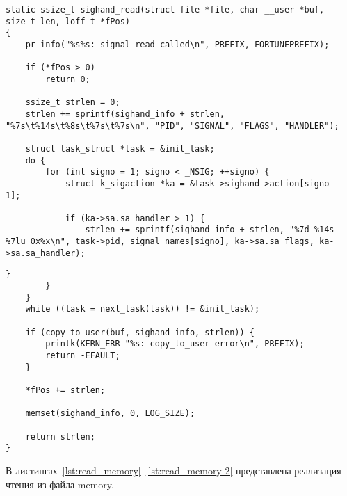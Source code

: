 \begin{lstlisting}[label=lst:read_sighands, caption=Реализация функции чтения из файла sighands]			
static ssize_t sighand_read(struct file *file, char __user *buf, size_t len, loff_t *fPos)
{
	pr_info("%s%s: signal_read called\n", PREFIX, FORTUNEPREFIX);
	
	if (*fPos > 0)
		return 0;
	
	ssize_t strlen = 0;
	strlen += sprintf(sighand_info + strlen, "%7s\t%14s\t%8s\t%7s\t%7s\n", "PID", "SIGNAL", "FLAGS", "HANDLER");
	
	struct task_struct *task = &init_task;
	do {
		for (int signo = 1; signo < _NSIG; ++signo) {
			struct k_sigaction *ka = &task->sighand->action[signo - 1];
			
			if (ka->sa.sa_handler > 1) {
				strlen += sprintf(sighand_info + strlen, "%7d %14s %7lu 0x%x\n", task->pid, signal_names[signo], ka->sa.sa_flags, ka->sa.sa_handler);
\end{lstlisting}
\begin{lstlisting}[label=lst:read_sighand-2, caption=Реализация функции чтения из файла sighands]				
			}
		}
	}
	while ((task = next_task(task)) != &init_task);
	
	if (copy_to_user(buf, sighand_info, strlen)) {
		printk(KERN_ERR "%s: copy_to_user error\n", PREFIX);
		return -EFAULT;
	}
	
	*fPos += strlen;
	
	memset(sighand_info, 0, LOG_SIZE);
	
	return strlen;
}
\end{lstlisting}

В листингах~\ref{lst:read_memory}--\ref{lst:read_memory-2} представлена реализация чтения из файла memory.

